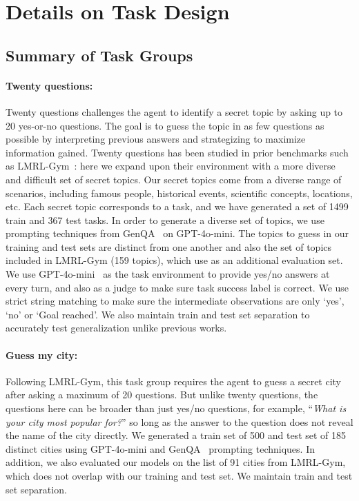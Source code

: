 \newpage
\appendix
\onecolumn

\section{Details on Task Design} \label{section:appendix_environment_design}

\subsection{Summary of Task Groups}

\paragraph{Twenty questions: } 
Twenty questions challenges the agent to identify a secret topic by asking up to 20 yes-or-no questions. The goal is to guess the topic in as few questions as possible by interpreting previous answers and strategizing to maximize information gained. Twenty questions has been studied in prior benchmarks such as LMRL-Gym~\citep{abdulhai2023lmrl}: here we expand upon their environment with a more diverse and difficult set of secret topics. Our secret topics come from a diverse range of scenarios, including famous people, historical events, scientific concepts, locations, etc. Each secret topic corresponds to a task, and we have generated a set of 1499 train and 367 test tasks. In order to generate a diverse set of topics, we use prompting techniques from GenQA~\citep{chen2024genqageneratingmillionsinstructions} on GPT-4o-mini. The topics to guess in our training and test sets are distinct from one another and also the set of topics included in LMRL-Gym (159 topics), which use as an additional evaluation set. We use GPT-4o-mini~\citep{hurst2024gpt,openai2024gpt4technicalreport} as the task environment to provide yes/no answers at every turn, and also as a judge to make sure task success label is correct. We use strict string matching to make sure the intermediate observations are only `yes', `no' or `Goal reached'. We also maintain train and test set separation to accurately test generalization unlike previous works.

\paragraph{Guess my city: } Following LMRL-Gym, this task group requires the agent to guess a secret city after asking a maximum of 20 questions. 
But unlike twenty questions, the questions here can be broader than just yes/no questions, for example, ``\emph{What is your city most popular for?}'' so long as the answer to the question does not reveal the name of the city directly. We generated a train set of 500 and test set of 185 distinct cities using GPT-4o-mini and GenQA~\citep{chen2024genqageneratingmillionsinstructions} prompting techniques. In addition, we also evaluated our models on the list of 91 cities from LMRL-Gym, which does not overlap with our training and test set. We maintain train and test set separation.

